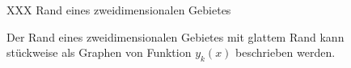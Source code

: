 %
%
%
\begin{figure}
\centering
\vspace*{2cm}
XXX Rand eines zweidimensionalen Gebietes
\vspace*{2cm}
\caption{Der Rand eines zweidimensionalen Gebietes mit glattem Rand
kann stückweise als Graphen von Funktion $y_k(x)$ beschrieben werden.
\label{buch:felder:fundamentallemma:fig:2drand}}
\end{figure}
